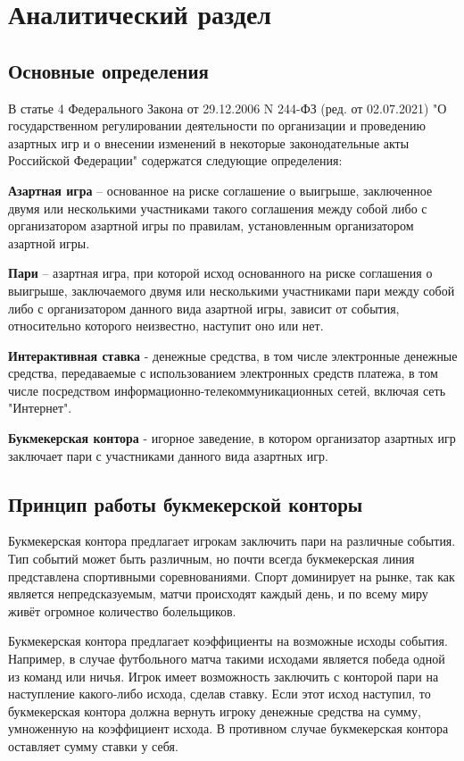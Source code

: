 \chapter{Аналитический раздел}

\section{Основные определения}
В статье 4 Федерального Закона от 29.12.2006 N 244-ФЗ (ред. от 02.07.2021) "О государственном регулировании деятельности по организации и проведению азартных игр и о внесении изменений в некоторые законодательные акты Российской Федерации" содержатся следующие определения:

\textbf{Азартная игра} -- основанное на риске соглашение о выигрыше, заключенное двумя или несколькими участниками такого соглашения между собой либо с организатором азартной игры по правилам, установленным организатором азартной игры.

\textbf{Пари} -- азартная игра, при которой исход основанного на риске соглашения о выигрыше, заключаемого двумя или несколькими участниками пари между собой либо с организатором данного вида азартной игры, зависит от события, относительно которого неизвестно, наступит оно или нет.

\textbf{Интерактивная ставка} - денежные средства, в том числе электронные денежные средства, передаваемые с использованием электронных средств платежа, в том числе посредством информационно-телекоммуникационных сетей, включая сеть "Интернет".

\textbf{Букмекерская контора} - игорное заведение, в котором организатор азартных игр заключает пари с участниками данного вида азартных игр.

\section{Принцип работы букмекерской конторы}
Букмекерская контора предлагает игрокам заключить пари на различные события. 
Тип событий может быть различным, но почти всегда букмекерская линия представлена спортивными соревнованиями.
Спорт доминирует на рынке, так как является непредсказуемым, матчи происходят каждый день, и по всему миру живёт огромное количество болельщиков.

Букмекерская контора предлагает коэффициенты на возможные исходы события. Например, в случае футбольного матча такими исходами является победа одной из команд или ничья. Игрок имеет возможность заключить с конторой пари на наступление какого-либо исхода, сделав ставку. Если этот исход наступил, то букмекерская контора должна вернуть игроку денежные средства на сумму, умноженную на коэффициент исхода. В противном случае букмекерская контора оставляет сумму ставки у себя.

